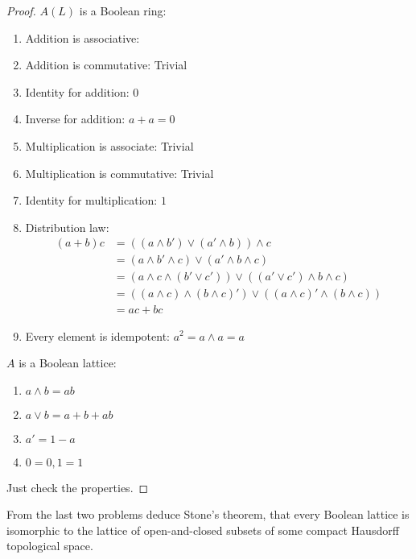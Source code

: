 \documentclass{solution}
\begin{document}
\begin{proof}
    $A(L)$ is a Boolean ring:
    \begin{enumerate}
        \item Addition is associative: 
        \item Addition is commutative: Trivial
        \item Identity for addition: $0$
        \item Inverse for addition: $a + a = 0$
        \item Multiplication is associate: Trivial
        \item Multiplication is commutative: Trivial
        \item Identity for multiplication: $1$
        \item Distribution law:
        $$
            \begin{aligned}
            (a + b)c &= ((a \wedge b') \vee (a' \wedge b)) \wedge c \\
            &= (a \wedge b' \wedge c) \vee (a' \wedge b \wedge c) \\
            &= (a \wedge c \wedge (b' \vee c')) \vee ((a' \vee c') \wedge b \wedge c) \\
            &= ((a \wedge c) \wedge (b \wedge c)') \vee ((a \wedge c)' \wedge (b \wedge c)) \\
            &= ac + bc
            \end{aligned}
        $$
        \item Every element is idempotent: $a^2 = a \wedge a = a$
    \end{enumerate}

    $A$ is a Boolean lattice:
    \begin{enumerate}
        \item $a \wedge b = ab$
        \item $a \vee b = a + b + ab$
        \item $a' = 1 - a$
        \item $0 = 0, 1 = 1$
    \end{enumerate}
    Just check the properties.
\end{proof}

\begin{problem}
    From the last two problems deduce Stone's theorem, that every Boolean lattice is isomorphic to the lattice of open-and-closed subsets of some compact Hausdorff topological space.
\end{problem}
\end{document}
